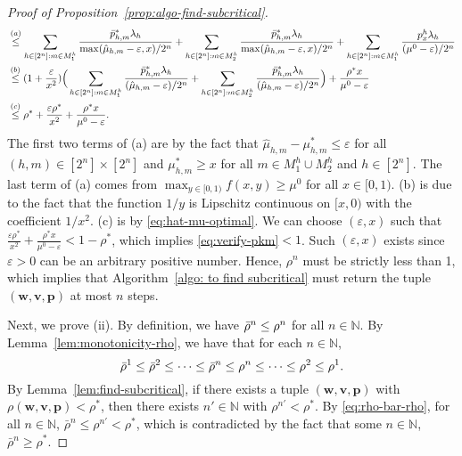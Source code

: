 \documentclass[11pt, reqno]{article}
\numberwithin{equation}{section}
\numberwithin{theorem}{section}
\newcommand{\N}{\mathbb{N}}                 %
\begin{document}
\begin{proof}[Proof of Proposition~\ref{prop:algo-find-subcritical}]
\begin{align}
    &\overset{(a)}{\leq} \sum_{h\in[2^n]: m\in M^h_1}\frac{\Bar{p}^*_{h,m}\lambda_h}{\max(\hat{\mu}_{h,m}-\varepsilon,x)/2^n}+\sum_{h\in[2^n]: m\in M^h_2}\frac{\bar{p}^*_{h,m}\lambda_h}{\max(\hat{\mu}_{h,m}-\varepsilon,x)/2^n}+\sum_{h\in[2^n]: m\in M^h_1}\frac{p^h_x\lambda_h}{(\mu^0-\varepsilon)/2^n}\nonumber\\
    &\overset{(b)}{\leq } (1+\frac{\varepsilon}{x^2})\Big(\sum_{h\in[2^n]: m\in M^h_1}\frac{\Bar{p}^*_{h,m}\lambda_h}{(\hat{\mu}_{h,m}-\varepsilon)/2^n}+\sum_{h\in[2^n]: m\in M^h_2}\frac{\bar{p}^*_{h,m}\lambda_h}{(\hat{\mu}_{h,m}-\varepsilon)/2^n}\Big)+\frac{\rho^*x}{\mu^0-\varepsilon}\nonumber\\
    &\overset{(c)}{\leq } \rho^*+\frac{\varepsilon\rho^*}{x^2}+\frac{\rho^*x}{\mu^0-\varepsilon}.
\end{align}
The first two terms of (a) are by the fact that $\hat{\mu}_{h,m}-\mu^*_{h,m}\leq \varepsilon$ for all $(h,m)\in[2^n]\times [2^n]$ and $\mu^*_{h,m}\geq x$ for all $m\in M^h_1\cup M^h_2$ and $h\in[2^n]$. The last term of (a) comes from $\max_{y\in[0,1)}f(x,y)\geq \mu^0$ for all $x\in[0,1)$. (b) is due to the fact that the function $1/y$ is Lipschitz continuous on $[x,0)$ with the coefficient $1/x^2$. (c) is by \eqref{eq:hat-mu-optimal}. We can choose $(\varepsilon,x)$ such that $ \frac{\varepsilon\rho^*}{x^2}+\frac{\rho^*x}{\mu^0-\varepsilon}<1-\rho^*$, which implies \eqref{eq:verify-pkm}$<1$. Such $(\varepsilon,x)$ exists since $\varepsilon>0$ can be an arbitrary positive number. Hence, $\rho^n$ must be strictly less than 1, which implies that Algorithm~\ref{algo: to find subcritical} must return the tuple $(\mathbf{w},\mathbf{v},\mathbf{p})$ at most $n$ steps.

Next, we prove (ii). By definition, we have $\Bar{\rho}^n\leq \rho^n$ for all $n\in \N$. By Lemma~\ref{lem:monotonicity-rho}, we have that for each $n\in \N$,
\begin{equation}\label{eq:rho-bar-rho}
    \Bar{\rho}^1\leq \Bar{\rho}^2\leq \cdots \leq \Bar{\rho}^n\leq  \rho^n\leq \cdots\leq  \rho^2\leq  \rho^1.
\end{equation}
By Lemma~\ref{lem:find-subcritical}, if there exists a tuple $(\mathbf{w},\mathbf{v},\mathbf{p})$ with $\rho(\mathbf{w},\mathbf{v},\mathbf{p})<\rho^*$, then there exists $n'\in\N$ with $\rho^{n'}<\rho^*$. By \eqref{eq:rho-bar-rho}, for all $n\in\N$, $\bar{\rho}^n\leq \rho^{n'}<\rho^*$, which is contradicted by the fact that some $n\in\N$, $\bar{\rho}^n\ge\rho^*$. 
\end{proof}
\end{document}
